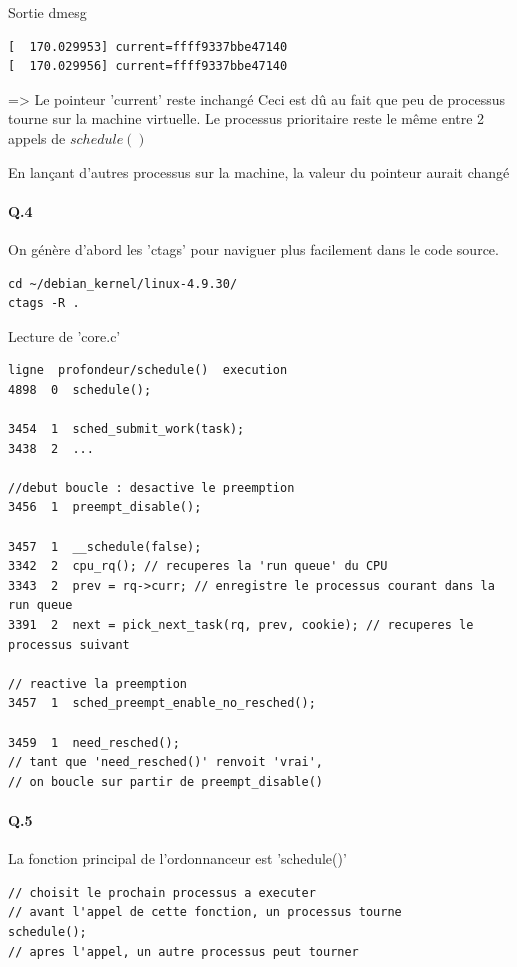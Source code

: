 \documentclass[10pt]{article}
\begin{document}
Sortie dmesg
\begin{lstlisting}[frame=single]
[  170.029953] current=ffff9337bbe47140
[  170.029956] current=ffff9337bbe47140
\end{lstlisting}

=> Le pointeur 'current' reste inchangé
Ceci est dû au fait que peu de processus tourne sur la machine virtuelle.
Le processus prioritaire reste le même entre 2 appels de $schedule()$

En lançant d'autres processus sur la machine, la valeur du pointeur aurait changé


\paragraph{Q.4}
On génère d'abord les 'ctags' pour naviguer plus facilement dans le code source.

\lstset{language=bash}
\begin{lstlisting}[frame=single]
cd ~/debian_kernel/linux-4.9.30/
ctags -R .
\end{lstlisting}


Lecture de 'core.c'
\lstset{language=C}
\begin{lstlisting}[frame=single]
ligne  profondeur/schedule()  execution
4898  0  schedule();

3454  1  sched_submit_work(task);
3438  2  ...

//debut boucle : desactive le preemption
3456  1  preempt_disable();

3457  1  __schedule(false);
3342  2  cpu_rq(); // recuperes la 'run queue' du CPU
3343  2  prev = rq->curr; // enregistre le processus courant dans la run queue
3391  2  next = pick_next_task(rq, prev, cookie); // recuperes le processus suivant

// reactive la preemption
3457  1  sched_preempt_enable_no_resched();

3459  1  need_resched();
// tant que 'need_resched()' renvoit 'vrai',
// on boucle sur partir de preempt_disable()
\end{lstlisting}
        
\paragraph{Q.5} La fonction principal de l'ordonnanceur est 'schedule()'

\lstset{language=C}
\begin{lstlisting}[frame=single]
// choisit le prochain processus a executer
// avant l'appel de cette fonction, un processus tourne
schedule();
// apres l'appel, un autre processus peut tourner
\end{lstlisting}
        
\end{document}
